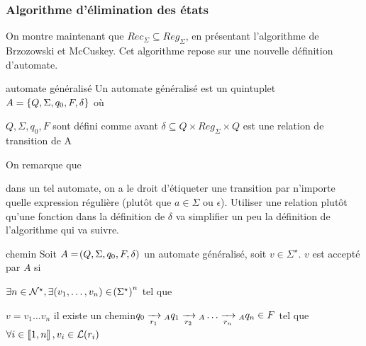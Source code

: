 \documentclass[a4paper,french,bookmarks]{book}
\begin{document}
    \subsubsection{Algorithme d'élimination des états}
    
    On montre maintenant que $Rec_\Sigma \subseteq Reg_\Sigma$, en présentant l'algorithme de Brzozowski et McCuskey. Cet algorithme repose sur une nouvelle définition d'automate.
    
    \begin{definition}{automate généralisé}{}
        Un automate généralisé est un quintuplet $A = \left\{Q, \Sigma, q_0, F, \delta\right\}$ où
        \begin{enumerate}
            \itt $Q, \Sigma, q_0, F$ sont défini comme avant
            \itt $\delta \subseteq Q \times Reg_\Sigma \times Q$ est une relation de transition de A
        \end{enumerate}
    
    \end{definition}
    On remarque que
    \begin{enumerate}
        \itt  dans un tel automate, on a le droit d'étiqueter une transition par n'importe quelle expression régulière (plutôt que $a \in \Sigma$ ou $\epsilon$).
        \itt Utiliser une relation plutôt qu'une fonction dans la définition de $\delta$ va simplifier un peu la définition de l'algorithme qui va suivre.
    \end{enumerate}

    \begin{definition}{chemin}{}
        Soit $A = \!\left(Q, \Sigma, q_0, F, \delta\right)$ un automate généralisé, soit $v \in \Sigma^\star$. $v$ est accepté par $A$ si
        \begin{enumerate}
            \itt $\exists n \in \mathcal{N}^\star, \exists \!\left(v_1, \dots, v_n\right) \in \!\left(\Sigma^\star\right)^n$ tel que
            \begin{enumerate}
                \itt $v = v_1 \dots v_n$
                \itt il existe un chemin$q_0 \lima{r_1}{}_A q_1 \lima{r_2}{}_A \dots \lima{r_n}{}_A q_n \in F$ tel que $\forall i \in \left\llbracket1, n\right\rrbracket, v_i \in \mathcal{L}\!\left(r_i\right)$
            \end{enumerate}
        \end{enumerate}
        
    \end{definition}
    
\end{document}
